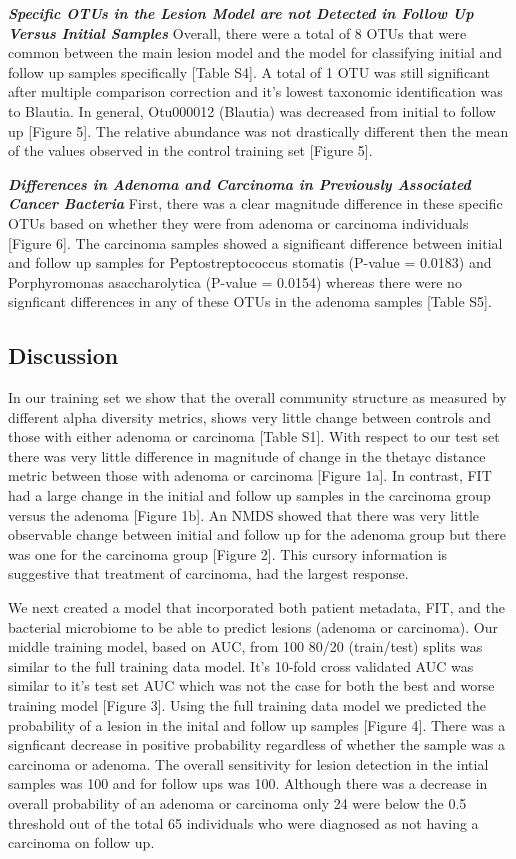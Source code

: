 \documentclass[12pt,]{article}
\begin{document}
\textbf{\emph{Specific OTUs in the Lesion Model are not Detected in
Follow Up Versus Initial Samples}} Overall, there were a total of 8 OTUs
that were common between the main lesion model and the model for
classifying initial and follow up samples specifically {[}Table S4{]}. A
total of 1 OTU was still significant after multiple comparison
correction and it's lowest taxonomic identification was to Blautia. In
general, Otu000012 (Blautia) was decreased from initial to follow up
{[}Figure 5{]}. The relative abundance was not drastically different
then the mean of the values observed in the control training set
{[}Figure 5{]}.

\textbf{\emph{Differences in Adenoma and Carcinoma in Previously
Associated Cancer Bacteria}} First, there was a clear magnitude
difference in these specific OTUs based on whether they were from
adenoma or carcinoma individuals {[}Figure 6{]}. The carcinoma samples
showed a significant difference between initial and follow up samples
for Peptostreptococcus stomatis (P-value = 0.0183) and Porphyromonas
asaccharolytica (P-value = 0.0154) whereas there were no signficant
differences in any of these OTUs in the adenoma samples {[}Table S5{]}.

\newpage

\subsection{Discussion}\label{discussion}

In our training set we show that the overall community structure as
measured by different alpha diversity metrics, shows very little change
between controls and those with either adenoma or carcinoma {[}Table
S1{]}. With respect to our test set there was very little difference in
magnitude of change in the thetayc distance metric between those with
adenoma or carcinoma {[}Figure 1a{]}. In contrast, FIT had a large
change in the initial and follow up samples in the carcinoma group
versus the adenoma {[}Figure 1b{]}. An NMDS showed that there was very
little observable change between initial and follow up for the adenoma
group but there was one for the carcinoma group {[}Figure 2{]}. This
cursory information is suggestive that treatment of carcinoma, had the
largest response.

We next created a model that incorporated both patient metadata, FIT,
and the bacterial microbiome to be able to predict lesions (adenoma or
carcinoma). Our middle training model, based on AUC, from 100 80/20
(train/test) splits was similar to the full training data model. It's
10-fold cross validated AUC was similar to it's test set AUC which was
not the case for both the best and worse training model {[}Figure 3{]}.
Using the full training data model we predicted the probability of a
lesion in the inital and follow up samples {[}Figure 4{]}. There was a
signficant decrease in positive probability regardless of whether the
sample was a carcinoma or adenoma. The overall sensitivity for lesion
detection in the intial samples was 100 and for follow ups was 100.
Although there was a decrease in overall probability of an adenoma or
carcinoma only 24 were below the 0.5 threshold out of the total 65
individuals who were diagnosed as not having a carcinoma on follow up.
\end{document}
